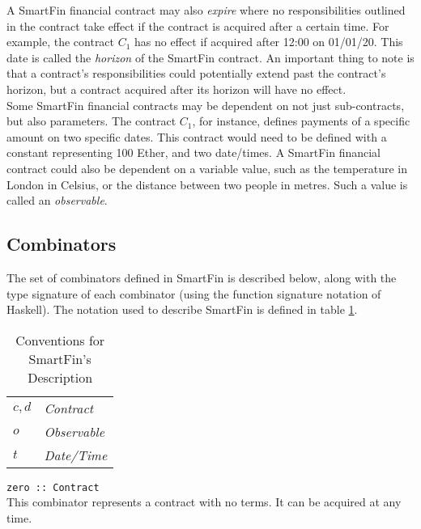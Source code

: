 A SmartFin financial contract may also \textit{expire} where no responsibilities outlined in the contract take effect if the contract is acquired after a certain time. For example, the contract $C_1$ has no effect if acquired after 12:00 on 01/01/20. This date is called the \textit{horizon} of the SmartFin contract. An important thing to note is that a contract's responsibilities could potentially extend past the contract's horizon, but a contract acquired after its horizon will have no effect. \\

Some SmartFin financial contracts may be dependent on not just sub-contracts, but also parameters. The contract $C_1$, for instance, defines payments of a specific amount on two specific dates. This contract would need to be defined with a constant representing 100 Ether, and two date/times. A SmartFin financial contract could also be dependent on a variable value, such as the temperature in London in Celsius, or the distance between two people in metres. Such a value is called an \textit{observable}.

\subsection{Combinators} \label{UG:combinators}

The set of combinators defined in SmartFin is described below, along with the type signature of each combinator (using the function signature notation of Haskell). The notation used to describe SmartFin is defined in table \ref{UG:dsl-notation}. \\

\begin{table}[ht]
    \begin{center}
        \begin{tabular}{|ll|}
            \hline
            $c, d$ &\textit{Contract} \\
            $o$ &\textit{Observable} \\
            $t$ &\textit{Date/Time} \\
            \hline
        \end{tabular}
        \caption{Conventions for SmartFin's Description}
        \label{UG:dsl-notation}
    \end{center}
\end{table}

\parbox{\textwidth}{
\texttt{zero :: Contract} \\

This combinator represents a contract with no terms. It can be acquired at any time. \\ \\

}

